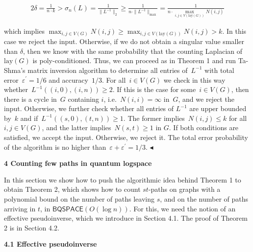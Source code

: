 \documentclass[10pt,a4paper]{article}
\begin{document}
\[\begin{gathered}
\displaystyle 2\delta=\frac{1}{n\cdot k}>\sigma_{n}(L)=\frac{1}{\|L^{-1}\|_{2}}\geq\frac{1}{n\cdot\|L^{-1}\|_{\max}}=\frac{1}{n\cdot\max_{i,j\in V(\mathrm{lay}(G))}N(i,j)}
\end{gathered}\]


which implies $\max_{i,j\in V(G)}N(i,j)\geq\max_{i,j\in V(\mathrm{lay}(G))}N(i,j)>k$.
In this case we reject the input.
Otherwise, if we do not obtain a singular value smaller than $\delta$, then we know with the same probability that the counting Laplacian of $\mathrm{lay}(G)$ is poly-conditioned.
Thus, we can proceed as in Theorem 1 and run Ta-Shma’s matrix inversion algorithm to determine all entries of $L^{-1}$ with total error $\varepsilon^{\prime}=1/6$ and accuracy $1/3$.
For all $i\in V(G)$ we check in this way whether $L^{-1}((i,0),(i,n))\geq 2$. If this is the case for some $i\in V(G)$, then there is a cycle in $G$ containing $i$, i.e. $N(i,i)=\infty$ in $G$, and we reject the input.
Otherwise, we further check whether all entries of $L^{-1}$ are upper bounded by $k$ and if $L^{-1}((s,0),(t,n))\geq 1$.
The former implies $N(i,j)\leq k$ for all $i,j\in V(G)$, and the latter implies $N(s,t)\geq 1$ in $G$.
If both conditions are satisfied, we accept the input.
Otherwise, we reject it.
The total error probability of the algorithm is no higher than $\varepsilon+\varepsilon^{\prime}=1/3$.
$\blacktriangleleft$\par







\par\medskip\noindent\textbf{
4 Counting few paths in quantum logspace}\par




In this section we show how to push the algorithmic idea behind Theorem 1 to obtain Theorem 2, which shows how to count $st$-paths on graphs with a polynomial bound on the number of paths leaving $s$, and on the number of paths arriving in $t$, in $\mathsf{BQSPACE}(O(\log n))$.
For this, we need the notion of an effective pseudoinverse, which we introduce in Section 4.1.
The proof of Theorem 2 is in Section 4.2.\par




\par\medskip\noindent\textbf{
4.1 Effective pseudoinverse}\par
\end{document}
